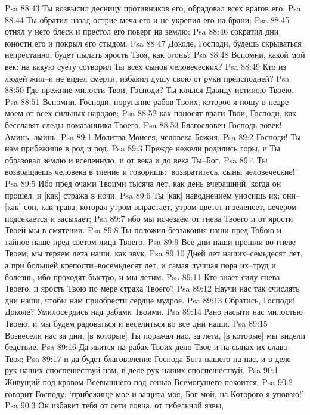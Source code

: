 Psa 88:43  Ты возвысил десницу противников его, обрадовал всех врагов его;
Psa 88:44  Ты обратил назад острие меча его и не укрепил его на брани;
Psa 88:45  отнял у него блеск и престол его поверг на землю;
Psa 88:46  сократил дни юности его и покрыл его стыдом.
Psa 88:47  Доколе, Господи, будешь скрываться непрестанно, будет пылать ярость Твоя, как огонь?
Psa 88:48  Вспомни, какой мой век: на какую суету сотворил Ты всех сынов человеческих?
Psa 88:49  Кто из людей жил--и не видел смерти, избавил душу свою от руки преисподней?
Psa 88:50  Где прежние милости Твои, Господи? Ты клялся Давиду истиною Твоею.
Psa 88:51  Вспомни, Господи, поругание рабов Твоих, которое я ношу в недре моем от всех сильных народов;
Psa 88:52  как поносят враги Твои, Господи, как бесславят следы помазанника Твоего.
Psa 88:53  Благословен Господь вовек! Аминь, аминь.
Psa 89:1  Молитва Моисея, человека Божия.
Psa 89:2  Господи! Ты нам прибежище в род и род.
Psa 89:3  Прежде нежели родились горы, и Ты образовал землю и вселенную, и от века и до века Ты--Бог.
Psa 89:4  Ты возвращаешь человека в тление и говоришь: `возвратитесь, сыны человеческие!'
Psa 89:5  Ибо пред очами Твоими тысяча лет, как день вчерашний, когда он прошел, и [как] стража в ночи.
Psa 89:6  Ты [как] наводнением уносишь их; они--[как] сон, как трава, которая утром вырастает, утром цветет и зеленеет, вечером подсекается и засыхает;
Psa 89:7  ибо мы исчезаем от гнева Твоего и от ярости Твоей мы в смятении.
Psa 89:8  Ты положил беззакония наши пред Тобою и тайное наше пред светом лица Твоего.
Psa 89:9  Все дни наши прошли во гневе Твоем; мы теряем лета наши, как звук.
Psa 89:10  Дней лет наших--семьдесят лет, а при большей крепости--восемьдесят лет; и самая лучшая пора их--труд и болезнь, ибо проходят быстро, и мы летим.
Psa 89:11  Кто знает силу гнева Твоего, и ярость Твою по мере страха Твоего?
Psa 89:12  Научи нас так счислять дни наши, чтобы нам приобрести сердце мудрое.
Psa 89:13  Обратись, Господи! Доколе? Умилосердись над рабами Твоими.
Psa 89:14  Рано насыти нас милостью Твоею, и мы будем радоваться и веселиться во все дни наши.
Psa 89:15  Возвесели нас за дни, [в которые] Ты поражал нас, за лета, [в которые] мы видели бедствие.
Psa 89:16  Да явится на рабах Твоих дело Твое и на сынах их слава Твоя;
Psa 89:17  и да будет благоволение Господа Бога нашего на нас, и в деле рук наших споспешествуй нам, в деле рук наших споспешествуй.
Psa 90:1  Живущий под кровом Всевышнего под сенью Всемогущего покоится,
Psa 90:2  говорит Господу: `прибежище мое и защита моя, Бог мой, на Которого я уповаю!'
Psa 90:3  Он избавит тебя от сети ловца, от гибельной язвы,
